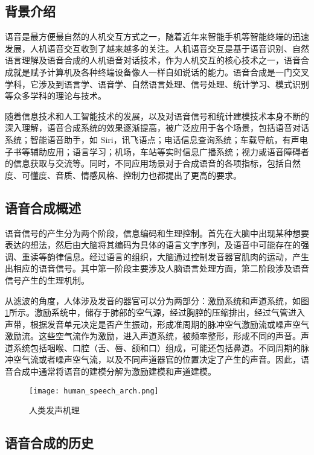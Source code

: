 \documentclass[cn,10pt,math=newtx,citestyle=gb7714-2015,bibstyle=gb7714-2015]{elegantbook}
\begin{document}
\subsection{背景介绍}

语音是最方便最自然的人机交互方式之一，随着近年来智能手机等智能终端的迅速发展，人机语音交互收到了越来越多的关注。人机语音交互是基于语音识别、自然语言理解及语音合成的人机语音对话技术，作为人机交互的核心技术之一，语音合成就是赋予计算机及各种终端设备像人一样自如说话的能力。语音合成是一门交叉学科，它涉及到语言学、语音学、自然语言处理、信号处理、统计学习、模式识别等众多学科的理论与技术。

随着信息技术和人工智能技术的发展，以及对语音信号和统计建模技术本身不断的深入理解，语音合成系统的效果逐渐提高，被广泛应用于各个场景，包括语音对话系统；智能语音助手，如 Siri，讯飞语点；电话信息查询系统；车载导航，有声电子书等辅助应用；语言学习；机场，车站等实时信息广播系统；视力或语音障碍者的信息获取与交流等。同时，不同应用场景对于合成语音的各项指标，包括自然度、可懂度、音质、情感风格、控制力也都提出了更高的要求。

\subsection{语音合成概述}

  语音信号的产生分为两个阶段，信息编码和生理控制。首先在大脑中出现某种想要表达的想法，然后由大脑将其编码为具体的语言文字序列，及语音中可能存在的强调、重读等韵律信息。经过语言的组织，大脑通过控制发音器官肌肉的运动，产生出相应的语音信号。其中第一阶段主要涉及人脑语言处理方面，第二阶段涉及语音信号产生的生理机制。

  从滤波的角度，人体涉及发音的器官可以分为两部分：激励系统和声道系统，如图\ref{fig:human_speech_arch}所示。激励系统中，储存于肺部的空气源，经过胸腔的压缩排出，经过气管进入声带，根据发音单元决定是否产生振动，形成准周期的脉冲空气激励流或噪声空气激励流。这些空气流作为激励，进入声道系统，被频率整形，形成不同的声音。声道系统包括咽喉、口腔（舌、唇、颌和口）组成，可能还包括鼻道。不同周期的脉冲空气流或者噪声空气流，以及不同声道器官的位置决定了产生的声音。因此，语音合成中通常将语音的建模分解为激励建模和声道建模。

  \begin{figure}[htbp]
    \centering
    \texttt{[image: human\_speech\_arch.png]}
    \caption{人类发声机理 \label{fig:human_speech_arch}}
  \end{figure}

\subsection{语音合成的历史}
  
\end{document}
